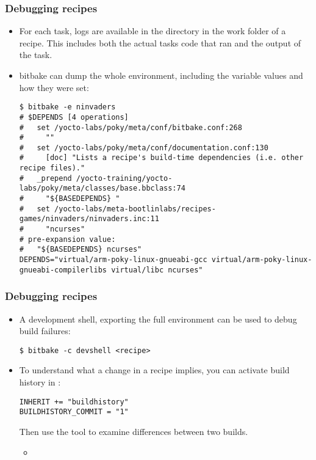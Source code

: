 \begin{frame}[fragile]
  \frametitle{Debugging recipes}
  \begin{itemize}
    \item For each task, logs are available in the 
      directory in the work folder of a recipe. This includes both
      the actual tasks code that ran and the output of the task.
    \item bitbake can dump the whole environment, including the
      variable values and how they were set:
      \begin{block}{}
        \begin{verbatim}
$ bitbake -e ninvaders
# $DEPENDS [4 operations]
#   set /yocto-labs/poky/meta/conf/bitbake.conf:268
#     ""
#   set /yocto-labs/poky/meta/conf/documentation.conf:130
#     [doc] "Lists a recipe's build-time dependencies (i.e. other recipe files)."
#   _prepend /yocto-training/yocto-labs/poky/meta/classes/base.bbclass:74
#     "${BASEDEPENDS} "
#   set /yocto-labs/meta-bootlinlabs/recipes-games/ninvaders/ninvaders.inc:11
#     "ncurses"
# pre-expansion value:
#   "${BASEDEPENDS} ncurses"
DEPENDS="virtual/arm-poky-linux-gnueabi-gcc virtual/arm-poky-linux-gnueabi-compilerlibs virtual/libc ncurses"
        \end{verbatim}
      \end{block}

  \end{itemize}
\end{frame}

\begin{frame}[fragile]
  \frametitle{Debugging recipes}
  \begin{itemize}
    \item A development shell, exporting the full environment can be
      used to debug build failures:
      \begin{block}{}
        \begin{verbatim}
$ bitbake -c devshell <recipe>
        \end{verbatim}
      \end{block}
    \item To understand what a change in a recipe implies, you can
      activate build history in :
      \begin{block}{}
        \begin{verbatim}
INHERIT += "buildhistory"
BUILDHISTORY_COMMIT = "1"
        \end{verbatim}
      \end{block}
      Then use the  tool to examine
      differences between two builds.
      \begin{itemize}
        \item {}
      \end{itemize}
  \end{itemize}
\end{frame}

